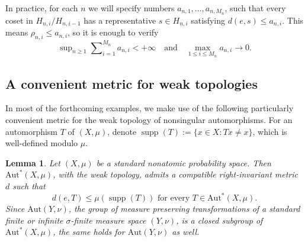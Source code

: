 \documentclass{amsart}
\providecommand{\lemmaname}{Lemma}
\numberwithin{equation}{subsection}
\theoremstyle{plain}
\newtheorem{lem}[lem]{\protect\lemmaname}
\theoremstyle{definition}
\theoremstyle{plain}
\begin{document}
In practice, for each \(n\) we will specify numbers \(a_{n,1},\dotsc,a_{n,M_{n}}\), such that every coset in \(H_{n,i}/H_{n,i-1}\) has a representative \(s\in H_{n,i}\) satisfying \(d\left(e,s\right)\leq a_{n,i}\). This means \(\rho_{n,i}\leq a_{n,i}\), so it is enough to verify
\[\sup\nolimits_{n\geq1}\sum\nolimits_{i=1}^{M_{n}}a_{n,i}<+\infty\quad\text{and}\quad\max_{1\leq i\leq M_{n}}a_{n,i}\to0.\]

\subsection{A convenient metric for weak topologies}

In most of the forthcoming examples, we make use of the following particularly convenient metric for the weak topology of nonsingular automorphisms. For an automorphism \(T\) of \(\left(X,\mu\right)\), denote \(\operatorname{supp}\left(T\right):=\{x\in X:Tx\neq x\}\), which is well-defined modulo \(\mu\).

\begin{lem}\label{lem:suppweak}
Let \(\left(X,\mu\right)\) be a standard nonatomic probability space. Then \(\mathrm{Aut}^{\ast}\left(X,\mu\right)\), with the weak topology, admits a compatible right-invariant metric \(d\) such that
\[d\left(e,T\right)\leq\mu\left(\operatorname{supp}\left(T\right)\right)\text{ for every }T\in\mathrm{Aut}^{\ast}\left(X,\mu\right).\]
Since \(\mathrm{Aut}\left(Y,\nu\right)\), the group of measure preserving transformations of a standard finite or infinite \(\sigma\)-finite measure space \(\left(Y,\nu\right)\), is a closed subgroup of \(\mathrm{Aut}^{\ast}\left(X,\mu\right)\), the same holds for \(\mathrm{Aut}\left(Y,\nu\right)\) as well.
\end{lem}
\end{document}
